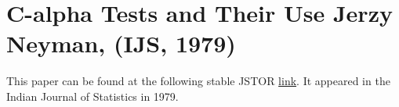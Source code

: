 \section{C-alpha Tests and Their Use {\small Jerzy Neyman, (IJS, 1979)}}


This paper can be found at the following stable JSTOR \href{https://www.jstor.org/stable/25050174}{link}. It appeared in the Indian Journal of Statistics in 1979.   
